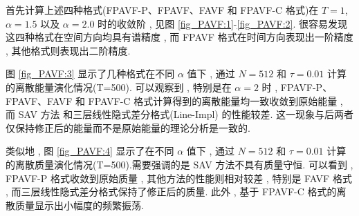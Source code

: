 首先计算上述四种格式(FPAVF-P、FPAVF、FAVF 和 FPAVF-C 格式)在 $T=1$, $\alpha=1.5$ 以及 $\alpha=2.0$  时的收敛阶 , 见图 \ref{fig_PAVF:1}-\ref{fig_PAVF:2}.
很容易发现这四种格式在空间方向均具有谱精度 , 而 FPAVF 格式在时间方向表现出一阶精度 , 其他格式则表现出二阶精度.

图 \ref{fig_PAVF:3} 显示了几种格式在不同 $\alpha$ 值下 , 通过 $N=512$ 和 $\tau=0.01$ 计算的离散能量演化情况(T=500).
可以观察到 , 特别是在 $\alpha=2$ 时 , FPAVF-P、FPAVF、FAVF 和 FPAVF-C 格式计算得到的离散能量均一致收敛到原始能量 , 
而 SAV 方法 \cite{chengConvergenceEnergyconservingScheme2022} 和三层线性隐式差分格式(Line-Impl) \cite{ranLinearlyImplicitConservative2016} 的性能较差.
这一现象与后两者仅保持修正后的能量而不是原始能量的理论分析是一致的.

	类似地 , 图 \ref{fig_PAVF:4} 显示了在不同 $\alpha$ 值下 , 通过 $N=512$ 和 $\tau=0.01$ 计算的离散质量演化情况(T=500).需要强调的是 SAV 方法不具有质量守恒.
可以看到 , FPAVF-P 格式收敛到原始质量 , 其他方法的性能则相对较差 , 特别是 FAVF 格式 , 而三层线性隐式差分格式保持了修正后的质量.
此外 , 基于 FPAVF-C 格式的离散质量显示出小幅度的频繁振荡.


